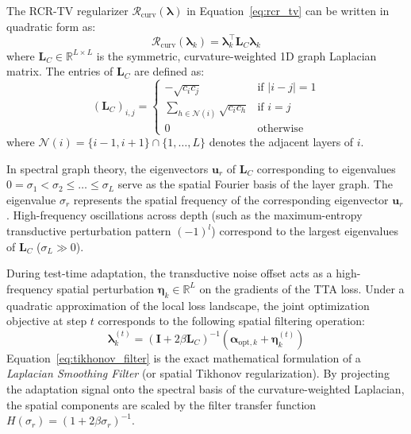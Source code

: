 The RCR-TV regularizer $\mathcal{R}_{\text{curv}}(\boldsymbol{\lambda})$ in Equation~\ref{eq:rcr_tv} can be written in quadratic form as:
\begin{equation}
\label{eq:laplacian_quad}
\mathcal{R}_{\text{curv}}(\boldsymbol{\lambda}_k) = \boldsymbol{\lambda}_k^\top \mathbf{L}_C \boldsymbol{\lambda}_k
\end{equation}
where $\mathbf{L}_C \in \mathbb{R}^{L \times L}$ is the symmetric, curvature-weighted 1D graph Laplacian matrix. The entries of $\mathbf{L}_C$ are defined as:
\begin{equation}
\label{eq:laplacian_entries}
(\mathbf{L}_C)_{i, j} = \begin{cases}
-\sqrt{c_i c_j} & \text{if } |i-j| = 1 \\
\sum_{h \in \mathcal{N}(i)} \sqrt{c_i c_h} & \text{if } i = j \\
0 & \text{otherwise}
\end{cases}
\end{equation}
where $\mathcal{N}(i) = \{i-1, i+1\} \cap \{1, \dots, L\}$ denotes the adjacent layers of $i$. 

In spectral graph theory, the eigenvectors $\mathbf{u}_r$ of $\mathbf{L}_C$ corresponding to eigenvalues $0 = \sigma_1 < \sigma_2 \le \dots \le \sigma_L$ serve as the spatial Fourier basis of the layer graph. The eigenvalue $\sigma_r$ represents the spatial frequency of the corresponding eigenvector $\mathbf{u}_r$. High-frequency oscillations across depth (such as the maximum-entropy transductive perturbation pattern $(-1)^l$) correspond to the largest eigenvalues of $\mathbf{L}_C$ ($\sigma_L \gg 0$).

During test-time adaptation, the transductive noise offset acts as a high-frequency spatial perturbation $\boldsymbol{\eta}_k \in \mathbb{R}^L$ on the gradients of the TTA loss. Under a quadratic approximation of the local loss landscape, the joint optimization objective at step $t$ corresponds to the following spatial filtering operation:
\begin{equation}
\label{eq:tikhonov_filter}
\boldsymbol{\lambda}_k^{(t)} = (\mathbf{I} + 2 \beta \mathbf{L}_C)^{-1} (\boldsymbol{\alpha}_{\text{opt}, k} + \boldsymbol{\eta}_k^{(t)})
\end{equation}
Equation~\ref{eq:tikhonov_filter} is the exact mathematical formulation of a \emph{Laplacian Smoothing Filter} (or spatial Tikhonov regularization). By projecting the adaptation signal onto the spectral basis of the curvature-weighted Laplacian, the spatial components are scaled by the filter transfer function $H(\sigma_r) = (1 + 2 \beta \sigma_r)^{-1}$.

